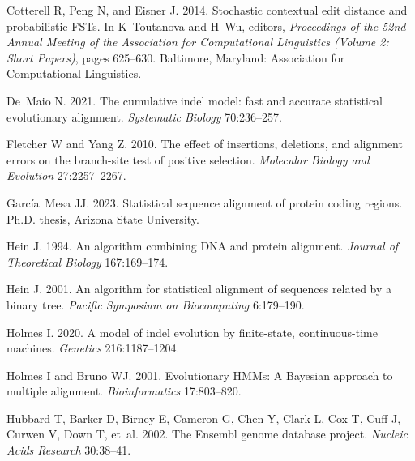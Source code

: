 \documentclass[12pt,letterpaper]{article}
\begin{document}
\begin{thebibliography}{44}
Cotterell R, Peng N, and Eisner J. 2014.
\newblock Stochastic contextual edit distance and probabilistic {FST}s.
\newblock In K~Toutanova and H~Wu, editors, \emph{Proceedings of the 52nd
  Annual Meeting of the Association for Computational Linguistics (Volume 2:
  Short Papers)}, pages 625--630. Baltimore, Maryland: Association for
  Computational Linguistics.

De~Maio N. 2021.
\newblock The cumulative indel model: fast and accurate statistical
  evolutionary alignment.
\newblock \emph{Systematic Biology} 70:236--257.

Fletcher W and Yang Z. 2010.
\newblock The effect of insertions, deletions, and alignment errors on the
  branch-site test of positive selection.
\newblock \emph{Molecular Biology and Evolution} 27:2257--2267.

Garc\'{i}a~Mesa JJ. 2023.
\newblock Statistical sequence alignment of protein coding regions.
\newblock Ph.D. thesis, Arizona State University.

Hein J. 1994.
\newblock An algorithm combining {DNA} and protein alignment.
\newblock \emph{Journal of Theoretical Biology} 167:169--174.

Hein J. 2001.
\newblock An algorithm for statistical alignment of sequences related by a
  binary tree.
\newblock \emph{Pacific Symposium on Biocomputing} 6:179--190.

Holmes I. 2020.
\newblock A model of indel evolution by finite-state, continuous-time machines.
\newblock \emph{Genetics} 216:1187--1204.

Holmes I and Bruno WJ. 2001.
\newblock Evolutionary {HMMs}: A {Bayesian} approach to multiple alignment.
\newblock \emph{Bioinformatics} 17:803--820.

Hubbard T, Barker D, Birney E, Cameron G, Chen Y, Clark L, Cox T, Cuff J,
  Curwen V, Down T, et~al. 2002.
\newblock The {Ensembl} genome database project.
\newblock \emph{Nucleic Acids Research} 30:38--41.


\end{thebibliography}
\end{document}
